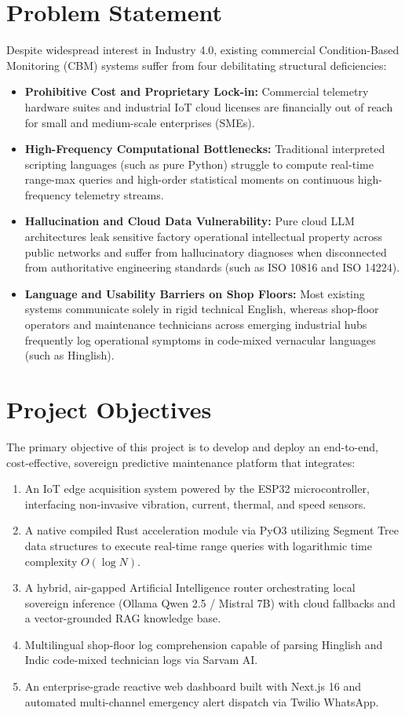 \documentclass[12pt,a4paper,oneside]{report}
\begin{document}
\section{Problem Statement}
Despite widespread interest in Industry 4.0, existing commercial Condition-Based Monitoring (CBM) systems suffer from four debilitating structural deficiencies:
\begin{itemize}[leftmargin=*,noitemsep]
    \item \textbf{Prohibitive Cost and Proprietary Lock-in:} Commercial telemetry hardware suites and industrial IoT cloud licenses are financially out of reach for small and medium-scale enterprises (SMEs).
    \item \textbf{High-Frequency Computational Bottlenecks:} Traditional interpreted scripting languages (such as pure Python) struggle to compute real-time range-max queries and high-order statistical moments on continuous high-frequency telemetry streams.
    \item \textbf{Hallucination and Cloud Data Vulnerability:} Pure cloud LLM architectures leak sensitive factory operational intellectual property across public networks and suffer from hallucinatory diagnoses when disconnected from authoritative engineering standards (such as ISO 10816 and ISO 14224).
    \item \textbf{Language and Usability Barriers on Shop Floors:} Most existing systems communicate solely in rigid technical English, whereas shop-floor operators and maintenance technicians across emerging industrial hubs frequently log operational symptoms in code-mixed vernacular languages (such as Hinglish).
\end{itemize}

\section{Project Objectives}
The primary objective of this project is to develop and deploy an end-to-end, cost-effective, sovereign predictive maintenance platform that integrates:
\begin{enumerate}[label=\textbf{\alph*.}]
    \item An IoT edge acquisition system powered by the ESP32 microcontroller, interfacing non-invasive vibration, current, thermal, and speed sensors.
    \item A native compiled Rust acceleration module via PyO3 utilizing Segment Tree data structures to execute real-time range queries with logarithmic time complexity $O(\log N)$.
    \item A hybrid, air-gapped Artificial Intelligence router orchestrating local sovereign inference (Ollama Qwen 2.5 / Mistral 7B) with cloud fallbacks and a vector-grounded RAG knowledge base.
    \item Multilingual shop-floor log comprehension capable of parsing Hinglish and Indic code-mixed technician logs via Sarvam AI.
    \item An enterprise-grade reactive web dashboard built with Next.js 16 and automated multi-channel emergency alert dispatch via Twilio WhatsApp.
\end{enumerate}
\end{document}
